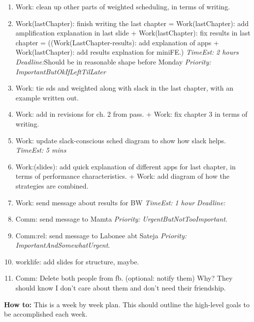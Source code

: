 \documentclass[11pt]{article}
\newcommand{\te}[1]{\textit{TimeEst:} \textit{#1}}
\newcommand{\priority}[1]{\textit{Priority:} \textit{#1}}
\newcommand{\pr}[1]{\textit{Priority:} \textit{#1}}
\newcommand{\dl}[1]{\textit{Deadline:}#1}
\begin{document}
\begin{enumerate}
\item Work: clean up other parts of weighted scheduling, in terms of
  writing. 

\item Work(lastChapter): finish writing the last chapter =
  Work(lastChapter): add amplification explanation in last slide + Work(lastChapter): fix results in last chapter =
  ((Work(LastChapter-results):  add explanation of apps   + Work(lastChapter): add
  results explnation for miniFE.) \te{2 hours} \dl{Should be in 
    reasonable shape before Monday} \pr{ImportantButOkIfLeftTilLater} 

\item Work: tie sds and weighted along with slack in the last chapter,
  with an example written out. 

\item Work: add in revisions for ch. 2 from pass.  + Work: fix chapter
  3 in terms of writing.  

\item Work: update slack-conscious sched diagram to show how slack
  helps. \te{5 mins} 

\item Work:(slides): add quick explanation of different apps for last
  chapter, in terms of performance characteristics.  + Work: add
  diagram of how the strategies are combined. 

\item Work: send message about results for BW \te{ 1 hour} \dl{} 


\item Comm: send message to Mamta \priority{UrgentButNotTooImportant}. 
\item Comm:rel: send message to Labonee abt Sateja \priority{ImportantAndSomewhatUrgent}. 


\item worklife: add slides for structure, maybe. 
\item Comm: Delete both people from fb. (optional: notify them) Why? They should know I don't
  care about them and don't need their friendship.  

\end{enumerate}
 
\newpage 
\textbf{How to:} This is a week by week plan. This should outline the high-level goals to be accomplished each week.  \\
\end{document}
